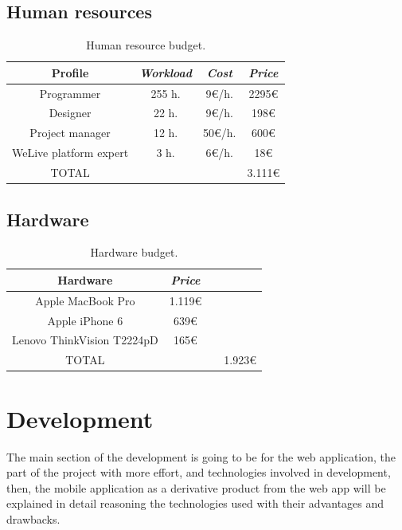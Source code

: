 \documentclass{DeustoFDP}
\begin{document}
\section{Human resources}
\begin{table}[H]
	\centering
	\caption{Human resource budget.}\label{tab:budgetprofile}
	\begin{tabular}{cccc}
		\toprule
		\textbf{Profile} & \emph{Workload} & \emph{Cost} & \emph{Price}\\
		\midrule
		Programmer  & 255 h.     & 9€/h. & 2295€ \\
		Designer   & 22 h.     & 9€/h. & 198€ \\
		Project manager & 12 h.     & 50€/h.  & 600€ \\
		WeLive platform expert & 3 h.     & 6€/h. & 18€ \\
		TOTAL & & & 3.111€\\
		\bottomrule
	\end{tabular}
\end{table}

\section{Hardware}
\begin{table}[H]
	\centering
	\caption{Hardware budget.}\label{tab:budgethardware}
	\begin{tabular}{cccc}
		\toprule
		\textbf{Hardware} & \emph{Price}\\
		\midrule
		Apple MacBook Pro  & 1.119€ \\
		Apple iPhone 6 & 639€ \\
		Lenovo ThinkVision T2224pD & 165€ \\
		
		TOTAL & & & 1.923€\\
		\bottomrule
	\end{tabular}
\end{table}


\chapter{Development}\label{cha:development}
The main section of the development is going to be for the web application, the part of the project with more effort, and technologies involved in development, then, the mobile application as a derivative product from the web app will be explained in detail reasoning the technologies used with their advantages and drawbacks.
\end{document}
